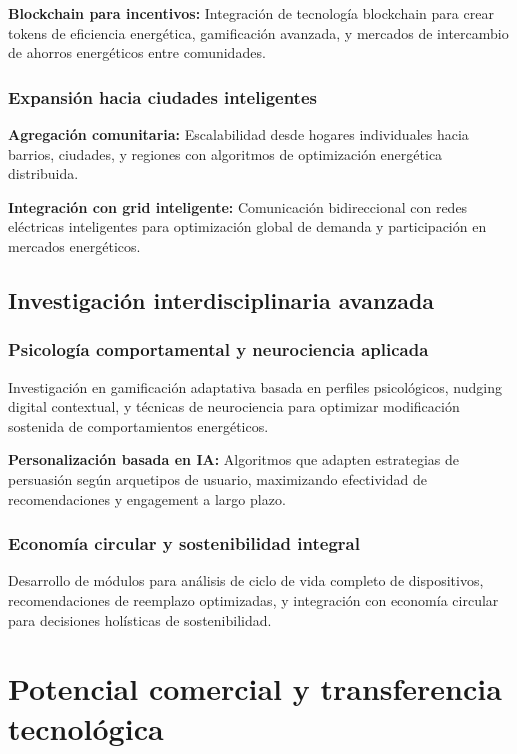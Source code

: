 \textbf{Blockchain para incentivos:} Integración de tecnología blockchain para crear tokens de eficiencia energética, gamificación avanzada, y mercados de intercambio de ahorros energéticos entre comunidades.

\subsubsection{Expansión hacia ciudades inteligentes}

\textbf{Agregación comunitaria:} Escalabilidad desde hogares individuales hacia barrios, ciudades, y regiones con algoritmos de optimización energética distribuida.

\textbf{Integración con grid inteligente:} Comunicación bidireccional con redes eléctricas inteligentes para optimización global de demanda y participación en mercados energéticos.

\subsection{Investigación interdisciplinaria avanzada}

\subsubsection{Psicología comportamental y neurociencia aplicada}

Investigación en gamificación adaptativa basada en perfiles psicológicos, nudging digital contextual, y técnicas de neurociencia para optimizar modificación sostenida de comportamientos energéticos.

\textbf{Personalización basada en IA:} Algoritmos que adapten estrategias de persuasión según arquetipos de usuario, maximizando efectividad de recomendaciones y engagement a largo plazo.

\subsubsection{Economía circular y sostenibilidad integral}

Desarrollo de módulos para análisis de ciclo de vida completo de dispositivos, recomendaciones de reemplazo optimizadas, y integración con economía circular para decisiones holísticas de sostenibilidad.

\section{Potencial comercial y transferencia tecnológica}

